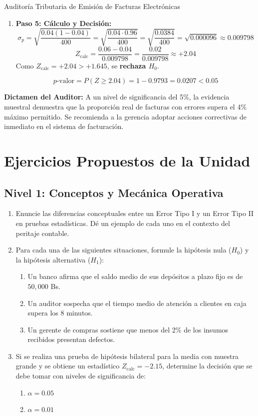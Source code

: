 \begin{ejemplo}{Auditoría Tributaria de Emisión de Facturas Electrónicas}
\begin{enumerate}
    \item \textbf{Paso 5: Cálculo y Decisión:}
    \[
    \sigma_p = \sqrt{\frac{0.04(1 - 0.04)}{400}} = \sqrt{\frac{0.04 \cdot 0.96}{400}} = \sqrt{\frac{0.0384}{400}} = \sqrt{0.000096} \approx 0.009798
    \]
    \[
    Z_{\text{calc}} = \frac{0.06 - 0.04}{0.009798} = \frac{0.02}{0.009798} \approx +2.04
    \]
    Como $Z_{\text{calc}} = +2.04 > +1.645$, se \textbf{rechaza $H_0$}.
    
    \[
    p\text{-valor} = P(Z \ge 2.04) = 1 - 0.9793 = 0.0207 < 0.05
    \]
\end{enumerate}

\textbf{Dictamen del Auditor:} A un nivel de significancia del 5\%, la evidencia muestral demuestra que la proporción real de facturas con errores supera el 4\% máximo permitido. Se recomienda a la gerencia adoptar acciones correctivas de inmediato en el sistema de facturación.
\end{ejemplo}

\section{Ejercicios Propuestos de la Unidad}

\subsection*{Nivel 1: Conceptos y Mecánica Operativa}
\begin{enumerate}
    \item Enuncie las diferencias conceptuales entre un Error Tipo I y un Error Tipo II en pruebas estadísticas. Dé un ejemplo de cada uno en el contexto del peritaje contable.
    \item Para cada una de las siguientes situaciones, formule la hipótesis nula ($H_0$) y la hipótesis alternativa ($H_1$):
    \begin{enumerate}
        \item Un banco afirma que el saldo medio de sus depósitos a plazo fijo es de $50{,}000$ Bs.
        \item Un auditor sospecha que el tiempo medio de atención a clientes en caja supera los 8 minutos.
        \item Un gerente de compras sostiene que menos del 2\% de los insumos recibidos presentan defectos.
    \end{enumerate}
    \item Si se realiza una prueba de hipótesis bilateral para la media con muestra grande y se obtiene un estadístico $Z_{\text{calc}} = -2.15$, determine la decisión que se debe tomar con niveles de significancia de:
    \begin{enumerate}
        \item $\alpha = 0.05$
        \item $\alpha = 0.01$
    \end{enumerate}
\end{enumerate}

